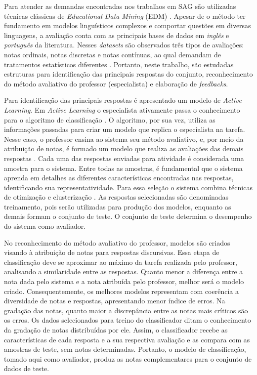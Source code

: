 Para atender as demandas encontradas nos trabalhos em SAG são utilizadas técnicas clássicas de \textit{Educational Data Mining} (EDM) \cite{romero2010}. Apesar de o método ter fundamento em modelos linguísticos complexos e comportar questões em diversas linguagens, a avaliação conta com as principais bases de dados em \textit{inglês} e \textit{português} da literatura. Nesses \textit{datasets} são observados três tipos de avaliações: notas ordinais, notas discretas e notas contínuas, ao qual demandam de tratamentos estatísticos diferentes \cite{morettin2010}. Portanto, neste trabalho, são estudadas estruturas para identificação das principais respostas do conjunto, reconhecimento do método avaliativo do professor (especialista) e elaboração de \textit{feedbacks}.

Para identificação das principais respostas é apresentado um modelo de \textit{Active Learning}. Em \textit{Active Learning} o especialista ativamente passa o conhecimento para o algoritmo de classificação \cite{silva2007, miller2020}. O algoritmo, por sua vez, utiliza as informações passadas para criar um modelo que replica o especialista na tarefa. Nesse caso, o professor ensina ao sistema seu método avaliativo, e, por meio da atribuição de notas, é formado um modelo que realiza as avaliações das demais respostas \cite{romero2010}. Cada uma das respostas enviadas para atividade é considerada uma amostra para o sistema. Entre todas as amostras, é fundamental que o sistema aprenda em detalhes as diferentes características encontradas nas respostas, identificando sua representatividade. Para essa seleção o sistema combina técnicas de otimização e clusterização \cite{everitt2011, spalenza2019}. As respostas selecionadas são denominadas treinamento, pois serão utilizadas para produção dos modelos, enquanto as demais formam o conjunto de teste. O conjunto de teste determina o desempenho do sistema como avaliador.

No reconhecimento do método avaliativo do professor, modelos são criados visando à atribuição de notas para respostas discursivas. Essa etapa de classificação deve se aproximar ao máximo da tarefa realizada pelo professor, analisando a similaridade entre as respostas. Quanto menor a diferença entre a nota dada pelo sistema e a nota atribuída pelo professor, melhor será o modelo criado. Consequentemente, os melhores modelos representam com coerência a diversidade de notas e respostas, apresentando menor índice de erros. Na gradação das notas, quanto maior a discrepância entre as notas mais críticos são os erros. Os dados selecionados para treino do classificador ditam o conhecimento da gradação de notas distribuídas por ele. Assim, o classificador recebe as características de cada resposta e a sua respectiva avaliação e as compara com as amostras de teste, sem notas determinadas. Portanto, o modelo de classificação, tomado aqui como avaliador, produz as notas complementares para o conjunto de dados de teste.

